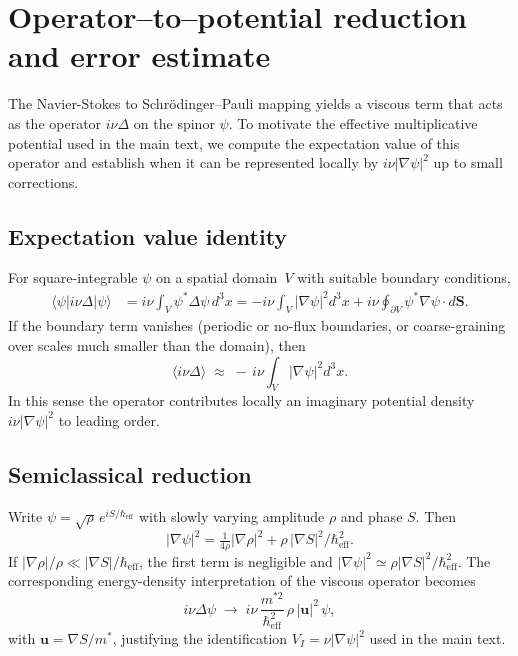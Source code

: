\documentclass[11pt]{article}
\begin{document}
\appendix
\section{Operator--to--potential reduction and error estimate}
\label{app:operator-to-potential}

The Navier-Stokes to Schr\"odinger--Pauli mapping yields a viscous term that acts as the operator $i\nu\Delta$ on the spinor $\psi$.
To motivate the effective multiplicative potential used in the main text, we compute the expectation value of this operator and establish when it can be represented locally by $i\nu|\nabla\psi|^2$ up to small corrections.

\subsection*{Expectation value identity}
For square-integrable $\psi$ on a spatial domain~$V$ with suitable boundary conditions,
\begin{align}
    \langle \psi | i\nu\Delta | \psi\rangle
    &= i\nu \!\int_V \psi^* \Delta \psi \, d^3x
       = -i\nu \!\int_V |\nabla\psi|^2 d^3x
       + i\nu \!\oint_{\partial V} \psi^* \nabla\psi\!\cdot\! d\mathbf S .
\end{align}
If the boundary term vanishes (periodic or no-flux boundaries, or coarse-graining over scales much smaller than the domain), then
\begin{equation}
    \langle i\nu\Delta \rangle \;\approx\; -\,i\nu \!\int_V |\nabla\psi|^2 d^3x .
\end{equation}
In this sense the operator contributes locally an imaginary potential density $i\nu|\nabla\psi|^2$ to leading order.

\subsection*{Semiclassical reduction}
Write $\psi=\sqrt{\rho}\,e^{iS/\hbar_{\mathrm{eff}}}$ with slowly varying amplitude $\rho$ and phase $S$.
Then
\[
|\nabla\psi|^2
= \tfrac{1}{4\rho}|\nabla\rho|^2
+ \rho\,|\nabla S|^2/\hbar_{\mathrm{eff}}^2 .
\]
If $|\nabla\rho|/\rho\ll|\nabla S|/\hbar_{\mathrm{eff}}$, the first term is negligible and
$|\nabla\psi|^2\simeq \rho|\nabla S|^2/\hbar_{\mathrm{eff}}^2$.
The corresponding energy-density interpretation of the viscous operator becomes
\begin{equation}
    i\nu\Delta\psi \;\longrightarrow\; i\nu\,\frac{m^{*2}}{\hbar_{\mathrm{eff}}^2}\,\rho\,|\mathbf u|^2\,\psi ,
\end{equation}
with $\mathbf u=\nabla S/m^*$, justifying the identification $V_I=\nu|\nabla\psi|^2$ used in the main text.
\end{document}
